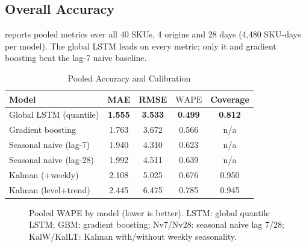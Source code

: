 \documentclass[conference]{IEEEtran}
\newcommand{\WAPE}{\mathrm{WAPE}}
\begin{document}
\subsection{Overall Accuracy}
 reports pooled metrics over all 40 SKUs, 4 origins and 28 days (4{,}480
SKU-days per model). The global LSTM leads on every metric; only it and gradient boosting beat the
lag-7 naive baseline.

\begin{table}[t]
\centering
\caption{Pooled Accuracy and Calibration}
\label{tab:results}
\footnotesize
\begin{tabular}{@{}l c c c c@{}}
\toprule
Model & MAE & RMSE & $\WAPE$ & Coverage \\
\midrule
Global LSTM (quantile) & \textbf{1.555} & \textbf{3.533} & \textbf{0.499} & \textbf{0.812} \\
Gradient boosting & 1.763 & 3.672 & 0.566 & n/a \\
Seasonal naive (lag-7) & 1.940 & 4.310 & 0.623 & n/a \\
Seasonal naive (lag-28) & 1.992 & 4.511 & 0.639 & n/a \\
Kalman (+weekly) & 2.108 & 5.025 & 0.676 & 0.950 \\
Kalman (level+trend) & 2.445 & 6.475 & 0.785 & 0.945 \\
\bottomrule
\end{tabular}
\end{table}

\begin{figure}[t]
\centering
{}
\caption{Pooled WAPE by model (lower is better). LSTM: global quantile LSTM; GBM: gradient
boosting; Nv7/Nv28: seasonal naive lag 7/28; KalW/KalLT: Kalman with/without weekly seasonality.}
\label{fig:wape-bar}
\end{figure}
\end{document}
